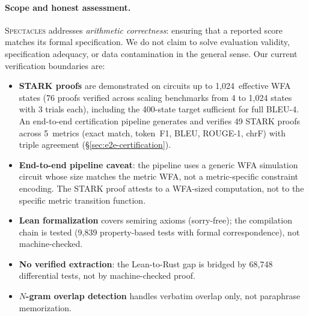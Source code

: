 \documentclass[11pt]{article}
\newcommand{\spectacles}{\textsc{Spectacles}}
\begin{document}
\paragraph{Scope and honest assessment.}
\spectacles{} addresses \emph{arithmetic correctness}: ensuring that a
reported score matches its formal specification.  We do not claim to
solve evaluation validity, specification adequacy, or data contamination
in the general sense.  Our current verification boundaries are:
\begin{itemize}[leftmargin=*,nosep]
\item \textbf{STARK proofs} are demonstrated on circuits up to
  1{,}024~effective WFA states (76 proofs verified across scaling
  benchmarks from 4 to 1{,}024 states with 3 trials each),
  including the 400-state target sufficient for full BLEU-4.
  An end-to-end certification pipeline generates and verifies
  49 STARK proofs across 5~metrics (exact match, token~F1, BLEU,
  ROUGE-1, chrF) with triple agreement (\S\ref{sec:e2e-certification}).
\item \textbf{End-to-end pipeline caveat}: the pipeline uses a generic
  WFA simulation circuit whose size matches the metric WFA, not a
  metric-specific constraint encoding.  The STARK proof attests
  to a WFA-sized computation, not to the specific metric transition
  function.
\item \textbf{Lean formalization} covers semiring axioms (sorry-free);
  the compilation chain is tested (9{,}839 property-based tests with
  formal correspondence), not machine-checked.
\item \textbf{No verified extraction}: the Lean-to-Rust gap is bridged
  by 68{,}748 differential tests, not by machine-checked proof.
\item \textbf{$N$-gram overlap detection} handles verbatim overlap
  only, not paraphrase memorization.
\end{itemize}
\end{document}
